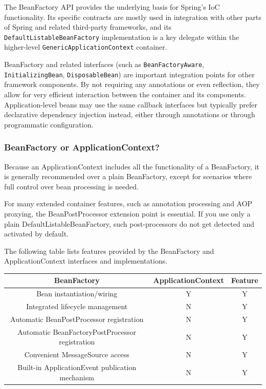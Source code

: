 \documentclass{scrartcl}
\begin{document}
The BeanFactory API provides the underlying basis for Spring’s IoC functionality. Its specific contracts are mostly used in integration with other parts of Spring and related third-party frameworks, and its \lstinline|DefaultListableBeanFactory| implementation is a key delegate within the higher-level \lstinline|GenericApplicationContext| container.

BeanFactory and related interfaces (such as \lstinline|BeanFactoryAware|, \lstinline|InitializingBean|, \lstinline|DisposableBean|) are important integration points for other framework components. By not requiring any annotations or even reflection, they allow for very efficient interaction between the container and its components. Application-level beans may use the same callback interfaces but typically prefer declarative dependency injection instead, either through annotations or through programmatic configuration.

\subsubsection{BeanFactory or ApplicationContext?}

Because an ApplicationContext includes all the functionality of a BeanFactory, it is generally recommended over a plain BeanFactory, except for scenarios where full control over bean processing is needed.

For many extended container features, such as annotation processing and AOP proxying, the BeanPostProcessor extension point is essential. If you use only a plain DefaultListableBeanFactory, such post-processors do not get detected and activated by default.

The following table lists features provided by the BeanFactory and ApplicationContext interfaces and implementations.

\begin{table}[h!]
\begin{tabular}{|c|c|c|}
    \hline
    BeanFactory &  ApplicationContext&  Feature\\
    \hline
    Bean instantiation/wiring&  Y&  Y\\
    \hline
    Integrated lifecycle management&  N&  Y\\
    \hline
    Automatic BeanPostProcessor registration&  N&  Y\\
    \hline
    Automatic BeanFactoryPostProcessor registration&  N&  Y\\
    \hline
    Convenient MessageSource access&  N&  Y\\
    \hline
    Built-in ApplicationEvent publication mechanism&  N&  Y\\
    \hline
    \hline
\end{tabular}
\end{table}
\end{document}
